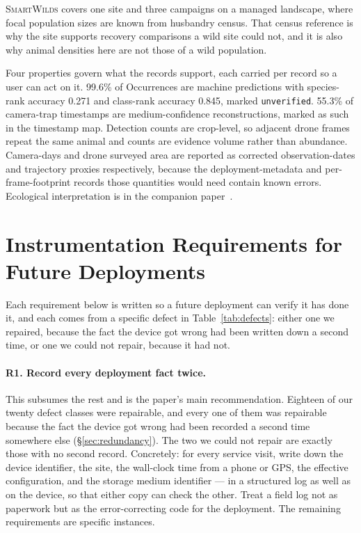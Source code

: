 \documentclass[sigconf]{acmart}
\newcommand{\smartwilds}{\textsc{SmartWilds}\xspace}
\begin{document}
\smartwilds covers one site and three campaigns on a managed landscape,
where focal population sizes are known from husbandry census. That
census reference is why the site supports recovery comparisons a wild
site could not, and it is also why animal densities here are not those
of a wild population.

Four properties govern what the records support, each carried per record
so a user can act on it. 99.6\% of Occurrences are machine predictions
with species-rank accuracy 0.271 and class-rank accuracy 0.845, marked
\texttt{unverified}. 55.3\% of camera-trap timestamps are
medium-confidence reconstructions, marked as such in the timestamp map.
Detection counts are crop-level, so adjacent drone frames repeat the
same animal and counts are evidence volume rather than abundance.
Camera-days and drone surveyed area are reported as corrected
observation-dates and trajectory proxies respectively, because the
deployment-metadata and per-frame-footprint records those quantities
would need contain known errors. Ecological interpretation is in the
companion paper~\cite{smartwilds_ecology}.

\section{Instrumentation Requirements for Future Deployments}
\label{sec:lessons}

Each requirement below is written so a future deployment can verify it
has done it, and each comes from a specific defect in
Table~\ref{tab:defects}: either one we repaired, because the fact the
device got wrong had been written down a second time, or one we could
not repair, because it had not.

\paragraph{R1. Record every deployment fact twice.}
This subsumes the rest and is the paper's main recommendation.
Eighteen of our twenty defect classes were repairable, and every one
of them was repairable because the fact the device got wrong had been
recorded a second time somewhere else (\S\ref{sec:redundancy}).
The two we could not repair are exactly those with no second record.
Concretely: for every service visit, write down the device identifier,
the site, the wall-clock time from a phone or GPS, the effective
configuration, and the storage medium identifier --- in a structured log
as well as on the device, so that either copy can check the other. Treat a field log not as paperwork but as the
error-correcting code for the deployment. The remaining requirements are
specific instances.
\end{document}
